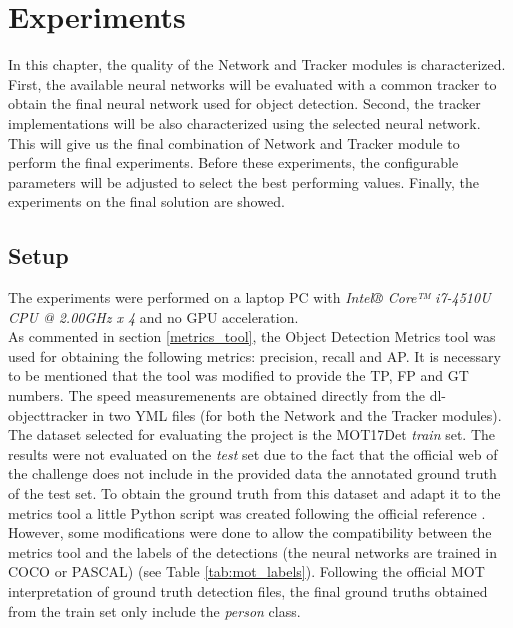 \chapter{Experiments}
In this chapter, the quality of the Network and Tracker modules is characterized. First, the available neural networks will be evaluated with a common tracker to obtain the final neural network used for object detection. Second, the tracker implementations will be also characterized using the selected neural network. This will give us the final combination of Network and Tracker module to perform the final experiments. Before these experiments, the configurable parameters will be adjusted to select the best performing values. Finally, the experiments on the final solution are showed.\\
\section{Setup}
The experiments were performed on a laptop PC with \textit{Intel® Core™ i7-4510U CPU @ 2.00GHz x 4} and no GPU acceleration.\\ As commented in section \ref{metrics_tool}, the Object Detection Metrics tool was used for obtaining the following metrics: precision, recall and AP. It is necessary to be mentioned that the tool was modified to provide the TP, FP and GT numbers. The speed measuremenents are obtained directly from the dl-objecttracker in two YML files (for both the Network and the Tracker modules).\\
The dataset selected for evaluating the project is the MOT17Det \textit{train} set. The results were not evaluated on the \textit{test} set due to the fact that the official web of the challenge does not include in the provided data the annotated ground truth of the test set. To obtain the ground truth from this dataset and adapt it to the metrics tool a little Python script was created following the official reference \cite{milan2016mot16}. However, some modifications were done to allow the compatibility between the metrics tool and the labels of the detections (the neural networks are trained in COCO or PASCAL) (see Table \ref{tab:mot_labels}). Following the official MOT interpretation of ground truth detection files, the final ground truths obtained from the train set only include the \textit{person} class.
